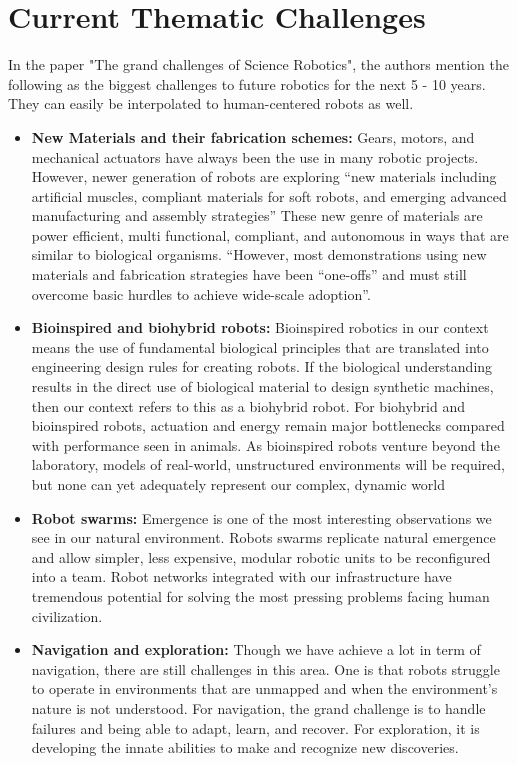 \documentclass[conference]{IEEEtran}
\begin{document}
\section{Current Thematic Challenges}
In the paper "The grand challenges of Science Robotics", the authors \textcite{yang2018grand} mention the following as the biggest challenges to future robotics for the next 5 - 10 years. They can easily be interpolated to human-centered robots as well.
\begin{itemize}
\item \textbf{New Materials and their fabrication schemes:} Gears, motors, and mechanical actuators have always been the use in many robotic projects. However, newer generation of robots are exploring ``new materials including artificial muscles, compliant materials for soft robots, and emerging advanced manufacturing and assembly strategies''\autocite{yang2018grand} These new genre of materials are power efficient, multi functional, compliant, and autonomous in ways that are similar to biological organisms. ``However, most demonstrations using new materials and fabrication strategies have been “one-offs” and must still overcome basic hurdles to achieve wide-scale adoption''\autocite{yang2018grand}. 
\item \textbf{Bioinspired and biohybrid robots:} Bioinspired robotics in our context means the  use of fundamental biological principles that are translated into engineering design rules for creating robots. If the biological understanding results in the direct use of biological material to design synthetic machines, then our context refers to this as a biohybrid robot. For biohybrid and bioinspired robots, actuation and energy remain major bottlenecks compared with performance seen in animals. As bioinspired robots venture beyond the laboratory, models of real-world, unstructured environments will be required, but none can yet adequately represent our complex, dynamic world
\item \textbf{Robot swarms:} Emergence is one of the most interesting observations we see in our natural environment. Robots swarms replicate natural emergence and allow simpler, less expensive,
modular robotic units to be reconfigured into a team. Robot networks integrated with our infrastructure have tremendous potential for solving the most pressing problems facing human civilization. 
\item \textbf{Navigation and exploration:} Though we have achieve a lot in term of navigation, there are still challenges in this area. One is that robots struggle to operate in environments that are unmapped and when the environment's nature is not understood\autocite{yang2018grand}. For navigation, the grand challenge is to handle failures and being able to adapt, learn, and recover. For exploration, it is developing the innate abilities to make and recognize new discoveries.

\end{itemize}
\end{document}
